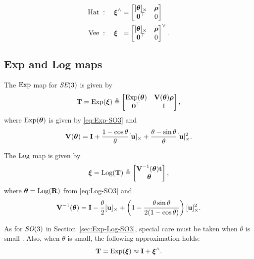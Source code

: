 \begin{align}
\begin{alignedat}{2}
  \text{Hat} \; &: \quad \vecxi^\wedge &&= 
    \begin{bmatrix}
    [\vectheta]_\times & \vecrho\\
    \matr{0}\trans & 0
  \end{bmatrix}\\
  \text{Vee} \; &: \quad \vecxi &&=
    \begin{bmatrix}
    [\vectheta]_\times & \vecrho\\
    \matr{0}\trans & 0
  \end{bmatrix}^\vee.
\end{alignedat}
\end{align}

\subsection{Exp and Log maps}
The $\Exp$ map for $\SE(3)$ is given by
\begin{equation} \label{eq:SE3-exp}
  \matT = \Exp(\vecxi) \triangleq 
  \begin{bmatrix}
    \Exp(\vectheta) & \matV(\vectheta) \vecrho\\
    \matr{0}\trans & 1
  \end{bmatrix},  
\end{equation}
where $\Exp(\vectheta)$ is given by \eqref{eq:Exp-SO3} and 
\begin{equation}
  \matV(\vectheta) = \matI + \frac{1 - \cos \theta}{\theta}[\vecu]_\times + \frac{\theta - \sin \theta}{\theta} [\vecu]^2_\times.
\end{equation}

The $\Log$ map is given by
\begin{equation}
  \vecxi = \Log(\matT) \triangleq 
  \begin{bmatrix}
    \matV^{-1}(\vectheta) \vect\\
    \vectheta
  \end{bmatrix},
\end{equation}
where $\vectheta = \Log(\matR)$ from \eqref{eq:Log-SO3} and
\begin{equation}
  \matV^{-1}(\vectheta) = \matI - \frac{\theta}{2}[\vecu]_\times + \left(1 - \frac{\theta \sin \theta}{2(1 - \cos \theta)} \right)[\vecu]^2_\times.
\end{equation}

As for $\SO(3)$ in Section~\ref{sec:Exp-Log-SO3}, special care must be taken when $\theta$ is small \cite{Eade2013LieTransformations}.
Also, when $\theta$ is small, the following approximation holds:
\begin{equation} \label{eq:SE3-Exp-approx}
  \matT = \Exp(\vecxi) \approx \matI + \vecxi^\wedge.
\end{equation}

